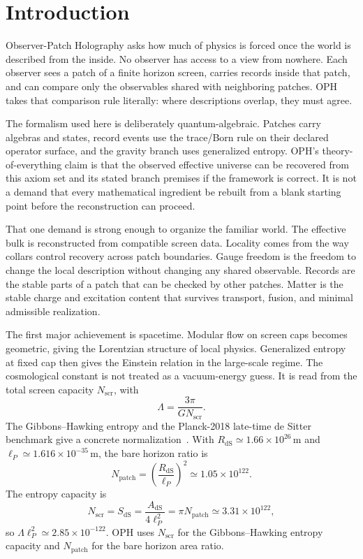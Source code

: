 \documentclass[11pt]{article}
\begin{document}
\tableofcontents
\newpage

\section{Introduction}

Observer-Patch Holography asks how much of physics is forced once the world is described from the
inside. No observer has access to a view from nowhere. Each observer sees a patch of a finite
horizon screen, carries records inside that patch, and can compare only the observables shared with
neighboring patches. OPH takes that comparison rule literally: where descriptions overlap, they must
agree.

The formalism used here is deliberately quantum-algebraic. Patches carry algebras and states,
record events use the trace/Born rule on their declared operator surface, and the gravity branch
uses generalized entropy. OPH's theory-of-everything claim is that the observed effective universe
can be recovered from this axiom set and its stated branch premises if the framework is correct.
It is not a demand that every mathematical ingredient be rebuilt from a blank starting point
before the reconstruction can proceed.

That one demand is strong enough to organize the familiar world. The effective bulk is reconstructed
from compatible screen data. Locality comes from the way collars control recovery across patch
boundaries. Gauge freedom is the freedom to change the local description without changing any shared
observable. Records are the stable parts of a patch that can be checked by other patches. Matter is
the stable charge and excitation content that survives transport, fusion, and minimal admissible
realization.

The first major achievement is spacetime. Modular flow on screen caps becomes geometric, giving the
Lorentzian structure of local physics. Generalized entropy at fixed cap then gives the Einstein
relation in the large-scale regime. The cosmological constant is not treated as a vacuum-energy
guess. It is read from the total screen capacity \(N_{\mathrm{scr}}\), with
\[
\Lambda=\frac{3\pi}{G N_{\mathrm{scr}}}.
\]
The Gibbons--Hawking entropy and the Planck-2018 late-time de Sitter benchmark give a concrete normalization~\cite{gibbonsHawking77,planck18}. With
\(R_{\mathrm{dS}}\simeq1.66\times10^{26}\,\mathrm m\) and
\(\ell_P\simeq1.616\times10^{-35}\,\mathrm m\), the bare horizon ratio is
\[
N_{\mathrm{patch}}=\left(\frac{R_{\mathrm{dS}}}{\ell_P}\right)^2\simeq1.05\times10^{122}.
\]
The entropy capacity is
\[
N_{\mathrm{scr}}=S_{\mathrm{dS}}=\frac{A_{\mathrm{dS}}}{4\ell_P^2}
=\pi N_{\mathrm{patch}}\simeq3.31\times10^{122},
\]
so \(\Lambda\ell_P^2\simeq2.85\times10^{-122}\). OPH uses \(N_{\mathrm{scr}}\) for the
Gibbons--Hawking entropy capacity and \(N_{\mathrm{patch}}\) for the bare horizon area ratio.
\end{document}
